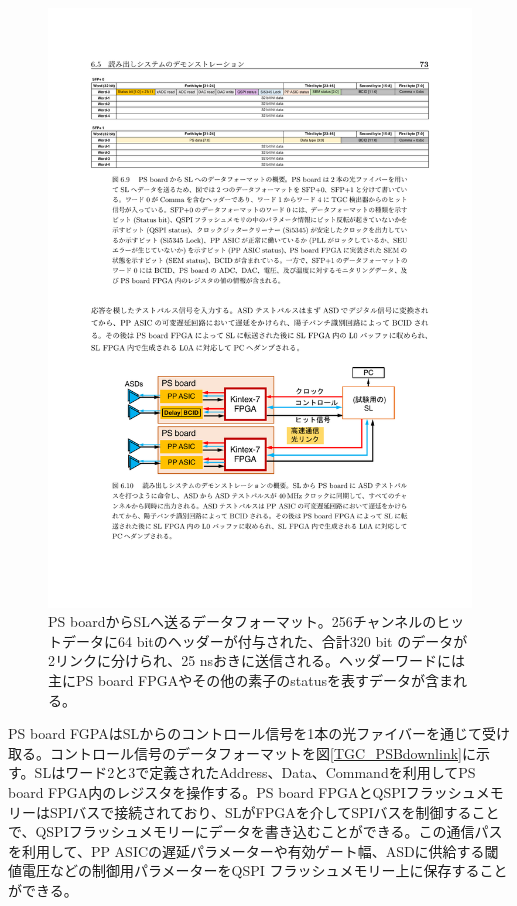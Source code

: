     \begin{figure} 
    \centering
    \includegraphics[width=16cm]{fig/Intro/TGC_PSBuplink.pdf}
    \caption[PS boardからSLへ送るデータフォーマット]{PS boardからSLへ送るデータフォーマット\cite{mt_aoki}。256チャンネルのヒットデータに64 bitのヘッダーが付与された、合計320 bit のデータが2リンクに分けられ、25 nsおきに送信される。ヘッダーワードには主にPS board FPGAやその他の素子のstatusを表すデータが含まれる。}
    \label{TGC_PSBuplink}
    \end{figure}

    PS board FGPAはSLからのコントロール信号を1本の光ファイバーを通じて受け取る。コントロール信号のデータフォーマットを図\ref{TGC_PSBdownlink}に示す。SLはワード2と3で定義されたAddress、Data、Commandを利用してPS board FPGA内のレジスタを操作する。PS board FPGAとQSPIフラッシュメモリーはSPIバスで接続されており、SLがFPGAを介してSPIバスを制御することで、QSPIフラッシュメモリーにデータを書き込むことができる。この通信パスを利用して、PP ASICの遅延パラメーターや有効ゲート幅、ASDに供給する閾値電圧などの制御用パラメーターをQSPI フラッシュメモリー上に保存することができる。

